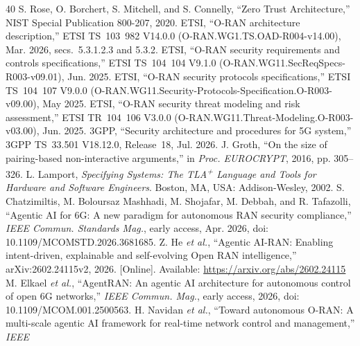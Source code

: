 \documentclass[journal]{IEEEtran}
\newif\ifshowrevisions
\newcommand{\rev}[1]{{\ifshowrevisions\color{blue}\else\color{black}\fi #1}}
\begin{document}
\renewcommand{\footnotesize}{\fontsize{8}{8.8}\selectfont}
\def\IEEEbibitemsep{-0.25pt plus .1pt}
\begin{thebibliography}{40}
S. Rose, O. Borchert, S. Mitchell, and S. Connelly, ``Zero Trust
Architecture,'' NIST Special Publication 800-207, 2020.
\rev{ETSI, ``O-RAN architecture description,'' ETSI TS~103~982 V14.0.0
(O-RAN.WG1.TS.OAD-R004-v14.00), Mar. 2026, secs.~5.3.1.2.3 and 5.3.2.}
ETSI, ``O-RAN security requirements and controls specifications,'' ETSI
TS~104~104 V9.1.0 (O-RAN.WG11.SecReqSpecs-R003-v09.01), Jun. 2025.
ETSI, ``O-RAN security protocols specifications,'' ETSI TS~104~107 V9.0.0
(O-RAN.WG11.Security-Protocols-Specification.O-R003-v09.00), May 2025.
ETSI, ``O-RAN security threat modeling and risk assessment,'' ETSI
TR~104~106 V3.0.0 (O-RAN.WG11.Threat-Modeling.O-R003-v03.00), Jun. 2025.
3GPP, ``Security architecture and procedures for 5G system,'' 3GPP
TS~33.501 V18.12.0, Release~18, Jul. 2026.
J. Groth, ``On the size of pairing-based non-interactive arguments,'' in
\emph{Proc. EUROCRYPT}, 2016, pp. 305--326.
L. Lamport, \emph{Specifying Systems: The TLA\textsuperscript{+} Language and
Tools for Hardware and Software Engineers}. Boston, MA, USA: Addison-Wesley,
2002.
S. Chatzimiltis, M. Boloursaz Mashhadi, M. Shojafar, M. Debbah, and
R. Tafazolli, ``Agentic AI for 6G: A new paradigm for autonomous RAN security
compliance,'' \emph{IEEE Commun. Standards Mag.}, early access, Apr. 2026,
doi: 10.1109/MCOMSTD.2026.3681685.
Z. He \emph{et al.}, ``Agentic AI-RAN: Enabling intent-driven, explainable and
self-evolving Open RAN intelligence,'' arXiv:2602.24115v2, 2026. [Online].
Available: \url{https://arxiv.org/abs/2602.24115}
M. Elkael \emph{et al.}, ``AgentRAN: An agentic AI architecture for autonomous
control of open 6G networks,'' \emph{IEEE Commun. Mag.}, early access, 2026,
doi: 10.1109/MCOM.001.2500563.
H. Navidan \emph{et al.}, ``Toward autonomous O-RAN: A multi-scale agentic AI
framework for real-time network control and management,'' \emph{IEEE
}
\end{thebibliography}
\end{document}
